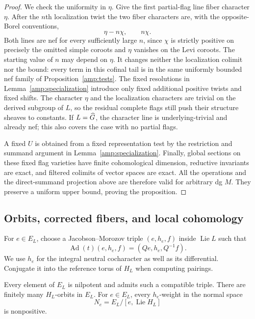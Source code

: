 \begin{proof}
We check the uniformity in $\eta$.  Give the first partial-flag line
fiber character $\eta$.  After the $n$th localization twist the two
fiber characters are, with the opposite-Borel conventions,
\[
 \eta-n\chi,\qquad n\chi.
\]
Both lines are nef for every sufficiently large $n$, since $\chi$
is strictly positive on precisely the omitted simple coroots and
$\eta$ vanishes on the Levi coroots.  The starting value of $n$ may
depend on $\eta$.  It changes neither the localization colimit nor
the bound: every term in this cofinal tail is in the same uniformly
bounded nef family of Proposition~\ref{amp:tests}.
The fixed resolutions in Lemma~\ref{amp:specialization} introduce
only fixed additional positive twists and fixed shifts.
The character $\eta$ and the localization characters are trivial
on the derived subgroup of $L$, so the residual complete flags still
push their structure sheaves to constants.
If $L=\widehat G$, the character line is underlying-trivial and already
nef; this also covers the case with no partial flags.

A fixed $U$ is obtained from a fixed representation test by the
restriction and summand argument in
Lemma~\ref{amp:specialization}.  Finally, global sections on these
fixed flag varieties have finite cohomological dimension,
reductive invariants are exact, and filtered colimits of vector
spaces are exact.  All the operations and the direct-summand
projection above are therefore valid for arbitrary dg $M$.
They preserve a uniform upper bound, proving the proposition.
\end{proof}

\subsection{Orbits, corrected fibers, and local cohomology}

For $e\in E_L$, choose a Jacobson--Morozov triple $(e,h_e,f)$
inside $\operatorname{Lie}L$ such that
\[
 \operatorname{Ad}(t)(e,h_e,f)=(Qe,h_e,Q^{-1}f).
\]
We use $h_e$ for the integral neutral cocharacter as well as its
differential.  Conjugate it into the reference torus of $H_L$ when
computing pairings.

\begin{lemma}
\label{amp:orbits}
Every element of $E_L$ is nilpotent and admits such a compatible
triple.  There are finitely many $H_L$-orbits in $E_L$.
For $e\in E_L$, every $h_e$-weight in the normal space
\[
 N_e=E_L/[e,\operatorname{Lie}H_L]
\]
is nonpositive.
\end{lemma}

